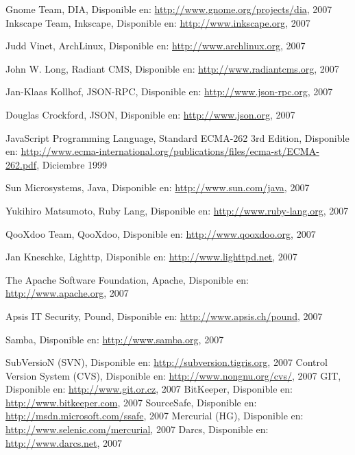 \begin{thebibliography}{99}

 Gnome Team, DIA, Disponible en: \url{http://www.gnome.org/projects/dia}, 2007
 Inkscape Team, Inkscape, Disponible en:
	\url{http://www.inkscape.org}, 2007

 Judd Vinet, ArchLinux, Disponible en:
	\url{http://www.archlinux.org}, 2007

 John W. Long, Radiant CMS, Disponible en:
	\url{http://www.radiantcms.org}, 2007

 Jan-Klaas Kollhof, JSON-RPC, Disponible en:
	\url{http://www.json-rpc.org}, 2007

Douglas Crockford, JSON, Disponible en:
	\url{http://www.json.org}, 2007

 JavaScript Programming Language, Standard ECMA-262 3rd Edition, Disponible en:
	\url{http://www.ecma-international.org/publications/files/ecma-st/ECMA-262.pdf}, Diciembre 1999

 Sun Microsystems, Java, Disponible en:
	\url{http://www.sun.com/java}, 2007

 Yukihiro Matsumoto, Ruby Lang, Disponible en:
	\url{http://www.ruby-lang.org}, 2007

 QooXdoo Team, QooXdoo, Disponible en:	
	\url{http://www.qooxdoo.org}, 2007

 Jan Kneschke, Lighttp, Disponible en:
	\url{http://www.lighttpd.net}, 2007
	
 The Apache Software Foundation, Apache, Disponible en:
	\url{http://www.apache.org}, 2007

 Apsis IT Security, Pound, Disponible en:
	\url{http://www.apsis.ch/pound}, 2007

 Samba, Disponible en: \url{http://www.samba.org}, 2007

 SubVersioN (SVN), Disponible en: \url{http://subversion.tigris.org}, 2007
 Control Version System (CVS), Disponible en: \url{http://www.nongnu.org/cvs/}, 2007
 GIT, Disponible en: \url{http://www.git.or.cz}, 2007
 BitKeeper, Disponible en: \url{http://www.bitkeeper.com}, 2007
 SourceSafe, Disponible en: \url{http://msdn.microsoft.com/ssafe}, 2007
 Mercurial (HG), Disponible en: \url{http://www.selenic.com/mercurial}, 2007
 Darcs, Disponible en: \url{http://www.darcs.net}, 2007


\end{thebibliography}
